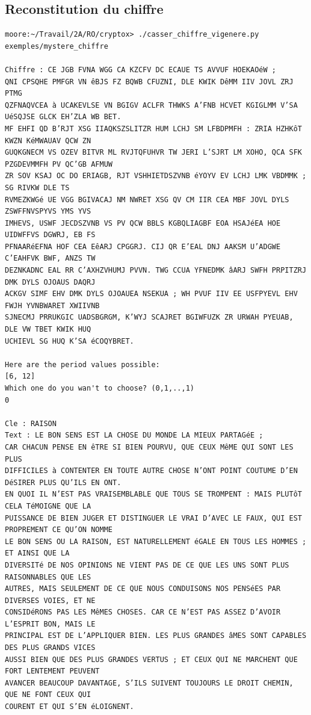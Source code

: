 \documentclass[a4paper, 11pt]{article}
\begin{document}
\subsection{Reconstitution du chiffre}

\begin{lstlisting}
moore:~/Travail/2A/RO/cryptox> ./casser_chiffre_vigenere.py exemples/mystere_chiffre 

Chiffre : CE JGB FVNA WGG CA KZCFV DC ECAUE TS AVVUF HOEKAOéW ;
QNI CPSQHE PMFGR VN êBJS FZ BQWB CFUZNI, DLE KWIK DêMM IIV JOVL ZRJ PTMG
QZFNAQVCEA à UCAKEVLSE VN BGIGV ACLFR THWKS A’FNB HCVET KGIGLMM V’SA UéSQJSE GLCK EH’ZLA WB BET.
MF EHFI QD B’RJT XSG IIAQKSZSLITZR HUM LCHJ SM LFBDPMFH : ZRIA HZHKôT KWZN KéMWAUAV QCW ZN
GUQKGNECM VS OZEV BITVR ML RVJTQFUHVR TW JERI L’SJRT LM XOHO, QCA SFK PZGDEVMMFH PV QC’GB AFMUW
ZR SOV KSAJ OC DO ERIAGB, RJT VSHHIETDSZVNB éYOYV EV LCHJ LMK VBDMMK ; SG RIVKW DLE TS
RVMEZKWGé UE VGG BGIVACAJ NM NWRET XSG QV CM IIR CEA MBF JOVL DYLS ZSWFFNVSPYVS YMS YVS
IMHEVS, USWF JECDSZVNB VS PV QCW BBLS KGBQLIAGBF EOA HSAJéEA HOE UIDWFFVS DGWRJ, EB FS
PFNAARéEFNA HOF CEA EêARJ CPGGRJ. CIJ QR E’EAL DNJ AAKSM U’ADGWE C’EAHFVK BWF, ANZS TW
DEZNKADNC EAL RR C’AXHZVHUMJ PVVN. TWG CCUA YFNEDMK âARJ SWFH PRPITZRJ DMK DYLS OJOAUS DAQRJ
ACKGV SIMF EHV DMK DYLS OJOAUEA NSEKUA ; WH PVUF IIV EE USFPYEVL EHV FWJH YVNBWARET XWIIVNB
SJNECMJ PRRUKGIC UADSBGRGM, K’WYJ SCAJRET BGIWFUZK ZR URWAH PYEUAB, DLE VW TBET KWIK HUQ
UCHIEVL SG HUQ K’SA éCOQYBRET.

Here are the period values possible:
[6, 12]
Which one do you wan't to choose? (0,1,..,1)
0

Cle : RAISON
Text : LE BON SENS EST LA CHOSE DU MONDE LA MIEUX PARTAGéE ;
CAR CHACUN PENSE EN êTRE SI BIEN POURVU, QUE CEUX MêME QUI SONT LES PLUS
DIFFICILES à CONTENTER EN TOUTE AUTRE CHOSE N’ONT POINT COUTUME D’EN DéSIRER PLUS QU’ILS EN ONT.
EN QUOI IL N’EST PAS VRAISEMBLABLE QUE TOUS SE TROMPENT : MAIS PLUTôT CELA TéMOIGNE QUE LA
PUISSANCE DE BIEN JUGER ET DISTINGUER LE VRAI D’AVEC LE FAUX, QUI EST PROPREMENT CE QU’ON NOMME
LE BON SENS OU LA RAISON, EST NATURELLEMENT éGALE EN TOUS LES HOMMES ; ET AINSI QUE LA
DIVERSITé DE NOS OPINIONS NE VIENT PAS DE CE QUE LES UNS SONT PLUS RAISONNABLES QUE LES
AUTRES, MAIS SEULEMENT DE CE QUE NOUS CONDUISONS NOS PENSéES PAR DIVERSES VOIES, ET NE
CONSIDéRONS PAS LES MêMES CHOSES. CAR CE N’EST PAS ASSEZ D’AVOIR L’ESPRIT BON, MAIS LE
PRINCIPAL EST DE L’APPLIQUER BIEN. LES PLUS GRANDES âMES SONT CAPABLES DES PLUS GRANDS VICES
AUSSI BIEN QUE DES PLUS GRANDES VERTUS ; ET CEUX QUI NE MARCHENT QUE FORT LENTEMENT PEUVENT
AVANCER BEAUCOUP DAVANTAGE, S’ILS SUIVENT TOUJOURS LE DROIT CHEMIN, QUE NE FONT CEUX QUI
COURENT ET QUI S’EN éLOIGNENT.
\end{lstlisting}
\end{document}

